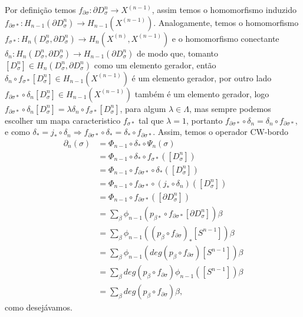 \documentclass[12pt]{book}
\newcommand{\celula}[2]{D^{#1}_{#2}}
\newcommand{\celulabordo}[2]{\partial D^{#1}_{#2}}
\newcommand{\homologia}[2]{H_{#1}(#2)}
\newcommand{\homologiarelcel}[3]{H_{#1}(D^{#2}_{#3}, \partial D^{#2}_{#3})}
\newcommand{\homologiarelskelesimpl}[2]{H_{#1}(X^{(#2)}, X^{(#2-1)})}
\newcommand{\skeleton}[1]{X^{(#1)}}
\begin{document}
{		Por definição temos $f_{\partial\sigma}: \celulabordo{n}{\sigma} \to \skeleton{n-1}$, assim temos o homomorfismo induzido $f_{\partial\sigma*}: \homologia{n-1}{\celulabordo{n}{\sigma} }\to \homologia{n-1}{\skeleton{n-1}}$. Analogamente, temos o homomorfismo $f_{\sigma*}:\homologiarelcel{n}{n}{\sigma} \to \homologiarelskelesimpl{n}{n}$ e o homomorfismo conectante $\delta_{n} : \homologiarelcel{n}{n}{\sigma} \to \homologia{n-1}{\celulabordo{n}{\sigma}}$ de modo que, tomanto $[\celula{n}{\sigma}] \in \homologiarelcel{n}{n}{\sigma}$ como um elemento gerador, então $\delta_{n}\circ f_{\sigma*}[\celula{n}{\sigma}] \in \homologia{n-1}{\skeleton{n-1}}$ é um elemento gerador, por outro lado $f_{\partial\sigma*}\circ \delta_{n}[\celula{n}{\sigma}] \in \homologia{n-1}{\skeleton{n-1}}$ também é um elemento gerador, logo $f_{\partial\sigma*}\circ \delta_{n}[\celula{n}{\sigma}] = \lambda \delta_{n}\circ f_{\sigma*}[\celula{n}{\sigma}]$, para algum $\lambda \in \Lambda$, mas sempre podemos escolher um mapa caracteristico $f_{\sigma *}$ tal que $\lambda = 1$, portanto $f_{\partial\sigma*}\circ \delta_{n} = \delta_{n}\circ f_{\partial\sigma*}$, e como $\delta_{*} = j_{*}\circ\delta_{n} \Rightarrow f_{\partial\sigma*}\circ \delta_{*} = \delta_{*}\circ f_{\partial\sigma*}$. Assim, temos o operador CW-bordo
		$$
		\begin{aligned}
		\partial_{n}(\sigma) &= \Phi_{n-1}\circ\delta_{*}\circ\Psi_{n}(\sigma)
		\\
		&= \Phi_{n-1}\circ\delta_{*}\circ f_{\sigma*}([\celula{n}{\sigma}])
		\\
		&= \Phi_{n-1}\circ f_{\partial\sigma*}\circ\delta_{*}([\celula{n}{\sigma}])
		\\
		&= \Phi_{n-1}\circ f_{\partial\sigma*}\circ (j_{*}\circ \delta_{n}) ([\celula{n}{\sigma}])
		\\
		&= \Phi_{n-1} \circ f_{\partial\sigma*}([\celulabordo{n}{\sigma}])
		\\
		&= \sum_{\beta} \phi_{n-1}(p_{\beta*}\circ f_{\partial\sigma*}[\celulabordo{n}{\sigma}])\beta
		\\
		&= \sum_{\beta} \phi_{n-1}((p_{\beta}\circ f_{\partial\sigma})_{*}[S^{n-1}])\beta
		\\
		&= \sum_{\beta} \phi_{n-1}(deg(p_{\beta}\circ f_{\partial\sigma})[S^{n-1}])\beta
		\\
		&= \sum_{\beta} deg(p_{\beta}\circ f_{\partial\sigma})\phi_{n-1}([S^{n-1}])\beta
		\\
		&= \sum_{\beta} deg(p_{\beta}\circ f_{\partial\sigma})\beta,
		\end{aligned}
		$$
		como desejávamos.}
\end{document}
